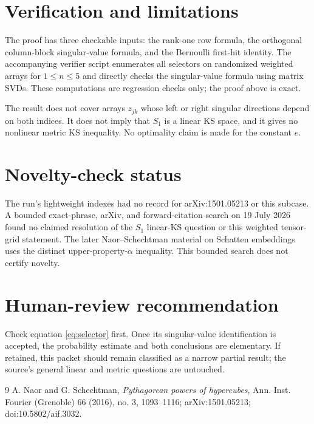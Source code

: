 \documentclass[11pt]{article}
\newcommand{\Sone}{S_1}
\begin{document}
\section{Verification and limitations}

The proof has three checkable inputs: the rank-one row formula, the orthogonal column-block singular-value formula, and the Bernoulli first-hit identity.  The accompanying verifier script enumerates all selectors on randomized weighted arrays for $1\le n\le5$ and directly checks the singular-value formula using matrix SVDs.  These computations are regression checks only; the proof above is exact.

The result does not cover arrays $z_{jk}$ whose left or right singular directions depend on both indices.  It does not imply that $\Sone$ is a linear KS space, and it gives no nonlinear metric KS inequality.  No optimality claim is made for the constant $e$.

\section{Novelty-check status}

The run's lightweight indexes had no record for arXiv:1501.05213 or this subcase.  A bounded exact-phrase, arXiv, and forward-citation search on 19 July 2026 found no claimed resolution of the $\Sone$ linear-KS question or this weighted tensor-grid statement.  The later Naor--Schechtman material on Schatten embeddings uses the distinct upper-property-$\alpha$ inequality.  This bounded search does not certify novelty.

\section{Human-review recommendation}

Check equation \eqref{eq:selector} first.  Once its singular-value identification is accepted, the probability estimate and both conclusions are elementary.  If retained, this packet should remain classified as a narrow partial result; the source's general linear and metric questions are untouched.

\begin{thebibliography}{9}
A. Naor and G. Schechtman,
\emph{Pythagorean powers of hypercubes},
Ann. Inst. Fourier (Grenoble) 66 (2016), no. 3, 1093--1116;
arXiv:1501.05213; doi:10.5802/aif.3032.
\end{thebibliography}
\end{document}
